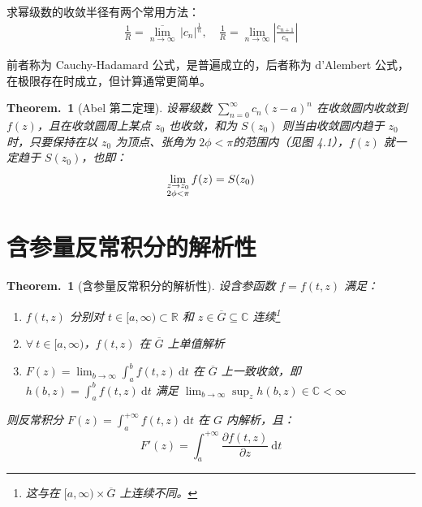 \documentclass[UTF8]{report}
\def\R{\mathbb{R}}
\def\C{\mathbb{C}}
\theoremstyle{MyLineTheoremStyle} %
\theoremstyle{MyBlockTheoremStyle} %
\newtheorem{BlockTheorem}[LineTheorem]{Theorem.\,} %
\theoremstyle{MySubsubsectionStyle} %
\begin{document}
求幂级数的收敛半径有两个常用方法：
\begin{gather}
\frac{1}{R} = \overline{\lim_{n \to \infty}} \, | c_n |^{\frac{1}{n}} ,\quad 
\frac{1}{R} = \lim_{n \to \infty} \left| \frac{c_{n+1}}{c_{n}} \right|
\end{gather}

前者称为 Cauchy-Hadamard 公式，是普遍成立的，后者称为 d'Alembert 公式，在极限存在时成立，但计算通常更简单。

\begin{BlockTheorem}[Abel 第二定理]\label{Abel 第二定理}
设幂级数 $\sum_{n = 0}^{\infty} c_n (z - a)^n$ 在收敛圆内收敛到 $f(z)$，且在收敛圆周上某点 $z_0$ 也收敛，和为 $S(z_0)$ 则当由收敛圆内趋于 $z_0$ 时，只要保持在以 $z_0$ 为顶点、张角为 $2 \phi < \pi$的范围内（见图 4.1），$f(z)$ 就一定趋于 $S(z_0)$，也即：
\begin{equation}
    \lim_{\begin{subarray}{c}
        z \to z_0 \\ 
        2 \phi < \pi
    \end{subarray}}     f(z) = S(z_0)
\end{equation}
\end{BlockTheorem}

\section{含参量反常积分的解析性}

\begin{BlockTheorem}[含参量反常积分的解析性]\label{含参量反常积分的解析性}
\hspace*{-2.8em} 设含参函数 $f = f(t,z)$ 满足：
\begin{enumerate}
\item $f(t,z)$ 分别对 $t\in [a, \infty) \subset \R $ 和 $z\in \overline{G} \subseteq \C$ 连续\footnote{这与在 $[a, \infty)\times \overline{G}$ 上连续不同。}
\item $\forall\ t \in [a, \infty)$，$f(t,z)$ 在 $\overline{G}$ 上单值解析
\item $\displaystyle F(z) = \lim_{b \to \infty} \int_{a}^{b} f(t,z) \ \mathrm{d}t$ 在 $\overline{G}$ 上一致收敛，即 $\displaystyle h(b,z) = \int_{a}^{b} f(t,z) \ \mathrm{d}t$ 满足 $\displaystyle \lim_{b \to \infty} \sup_{z} h(b,z) \in \C < \infty$
\end{enumerate}
则反常积分 $\displaystyle F(z) = \int_{a}^{+\infty} f(t,z)\ \mathrm{d}t$ 在 $G$ 内解析，且：
\begin{equation}
F'(z) = \int_{a}^{+\infty} \frac{\partial f(t,z)}{\partial z}\ \mathrm{d}t
\end{equation}
\end{BlockTheorem}
\end{document}
